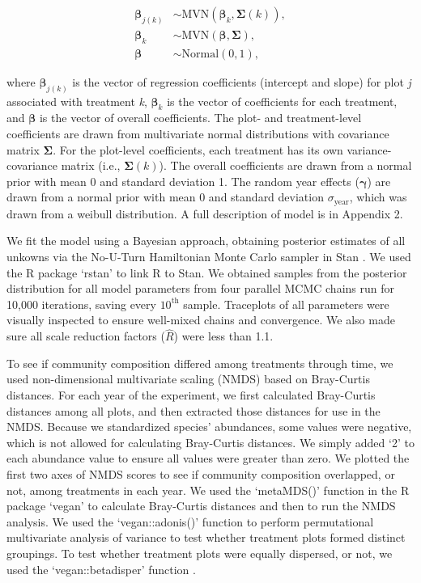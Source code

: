 \documentclass[fleqn,10pt,lineno]{wlpeerj} %
\begin{document}
\vspace{-1em}

\begin{align}
\boldsymbol{\beta}_{j(k)} &\sim \text{MVN} \left( \boldsymbol{\beta}_k, \boldsymbol{\Sigma}(k) \right), \\
\boldsymbol{\beta}_{k} &\sim \text{MVN} \left( \boldsymbol{\beta}, \boldsymbol{\Sigma}  \right), \\
\boldsymbol{\beta} &\sim \text{Normal} \left( 0, 1 \right),
\end{align}

\noindent{}where \(\boldsymbol{\beta}_{j(k)}\) is the vector of
regression coefficients (intercept and slope) for plot \emph{j}
associated with treatment \emph{k}, \(\boldsymbol{\beta}_{k}\) is the
vector of coefficients for each treatment, and \(\boldsymbol{\beta}\) is
the vector of overall coefficients. The plot- and treatment-level
coefficients are drawn from multivariate normal distributions with
covariance matrix \(\boldsymbol{\Sigma}\). For the plot-level
coefficients, each treatment has its own variance-covariance matrix
(i.e., \(\boldsymbol{\Sigma}(k)\)). The overall coefficients are drawn
from a normal prior with mean 0 and standard deviation 1. The random
year effects (\(\boldsymbol{\gamma}\)) are drawn from a normal prior
with mean 0 and standard deviation \(\sigma_{\text{year}}\), which was
drawn from a weibull distribution. A full description of model is in
Appendix 2.

We fit the model using a Bayesian approach, obtaining posterior
estimates of all unkowns via the No-U-Turn Hamiltonian Monte Carlo
sampler in Stan \citep{stan2016}. We used the R package `rstan'
\citep{rstan2016} to link R \citep{R2016} to Stan. We obtained samples
from the posterior distribution for all model parameters from four
parallel MCMC chains run for 10,000 iterations, saving every
\(10^{\text{th}}\) sample. Traceplots of all parameters were visually
inspected to ensure well-mixed chains and convergence. We also made sure
all scale reduction factors (\(\hat{R}\)) were less than 1.1.

To see if community composition differed among treatments through time,
we used non-dimensional multivariate scaling (NMDS) based on Bray-Curtis
distances. For each year of the experiment, we first calculated
Bray-Curtis distances among all plots, and then extracted those
distances for use in the NMDS. Because we standardized species'
abundances, some values were negative, which is not allowed for
calculating Bray-Curtis distances. We simply added `2' to each abundance
value to ensure all values were greater than zero. We plotted the first
two axes of NMDS scores to see if community composition overlapped, or
not, among treatments in each year. We used the `metaMDS()' function in
the R package `vegan' \citep{Oksanen2016} to calculate Bray-Curtis
distances and then to run the NMDS analysis. We used the
`vegan::adonis()' function \citep{Oksanen2016} to perform permutational
multivariate analysis of variance to test whether treatment plots formed
distinct groupings. To test whether treatment plots were equally
dispersed, or not, we used the `vegan::betadisper' function
\citep{Oksanen2016}.
\end{document}
